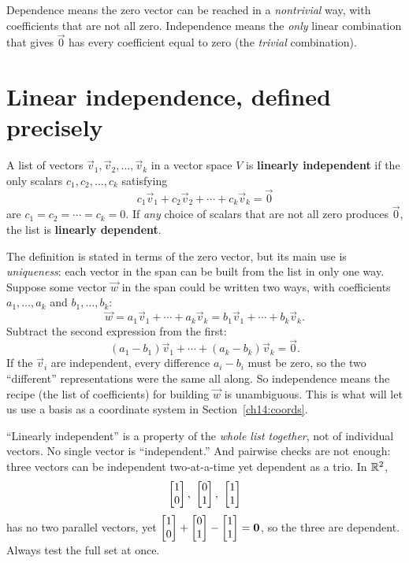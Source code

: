 \begin{focusbox}
Dependence means the zero vector can be reached in a \emph{nontrivial} way,
with coefficients that are not all zero. Independence means the \emph{only}
linear combination that gives $\vec{0}$ has every coefficient equal to zero
(the \emph{trivial} combination).
\end{focusbox}

\section{Linear independence, defined precisely}
\label{ch14:def}

\begin{definition}
\label{ch14:def-indep}
A list of vectors $\vec{v}_1, \vec{v}_2, \dots, \vec{v}_k$ in a vector space $V$
is \textbf{linearly independent} if the only scalars $c_1, c_2, \dots, c_k$
satisfying
\[
  c_1 \vec{v}_1 + c_2 \vec{v}_2 + \cdots + c_k \vec{v}_k = \vec{0}
\]
are $c_1 = c_2 = \cdots = c_k = 0$. If \emph{any} choice of scalars that are not
all zero produces $\vec{0}$, the list is \textbf{linearly dependent}.
\end{definition}

The definition is stated in terms of the zero vector, but its main use is
\emph{uniqueness}: each vector in the span can be built from the list in only one way.
Suppose some vector $\vec{w}$ in the span could be written two ways, with
coefficients $a_1,\dots,a_k$ and $b_1,\dots,b_k$:
\[
  \vec{w} = a_1\vec{v}_1 + \cdots + a_k\vec{v}_k
        = b_1\vec{v}_1 + \cdots + b_k\vec{v}_k .
\]
Subtract the second expression from the first:
\[
  (a_1-b_1)\vec{v}_1 + \cdots + (a_k-b_k)\vec{v}_k = \vec{0}.
\]
If the
$\vec{v}_i$ are independent, every difference $a_i - b_i$ must be zero, so the
two ``different'' representations were the same all along. So independence
means the recipe (the list of coefficients) for building $\vec{w}$ is unambiguous.
This is what will let us use a basis as a coordinate system in
Section~\ref{ch14:coords}.

\begin{trapbox}
``Linearly independent'' is a property of the \emph{whole list together}, not of
individual vectors. No single vector is ``independent.'' And pairwise checks are
not enough: three vectors can be independent two-at-a-time yet dependent as a
trio. In $\mathbb{R}^2$,
\[
  \colvec{1\\0},\ \colvec{0\\1},\ \colvec{1\\1}
\]
has no two parallel vectors, yet $\begin{bmatrix}1\\0\end{bmatrix}+\begin{bmatrix}0\\1\end{bmatrix}-\begin{bmatrix}1\\1\end{bmatrix}=\mathbf{0}$,
so the three are dependent. Always test the full set at once.
\end{trapbox}

